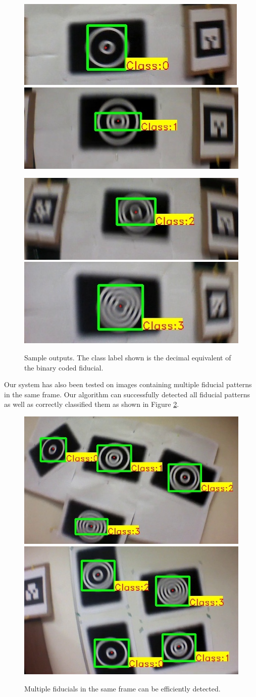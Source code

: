 \documentclass[10pt,twocolumn,letterpaper]{article}
\begin{document}
\begin{figure}[h!]
\centering
  \includegraphics[width=0.4\linewidth]{images/output_00.jpg}
  \includegraphics[width=0.4\linewidth]{images/output_01.jpg}

  \includegraphics[width=0.4\linewidth]{images/output_10.jpg}
  \includegraphics[width=0.4\linewidth]{images/output_11.jpg}
  \caption{Sample outputs. The class label shown is the decimal equivalent
  of the binary coded fiducial.}
  \label{fig:out_outputs}
\end{figure}

Our system has also been tested on images containing multiple fiducial
patterns in the same frame. Our algorithm can successfully detected
all fiducial patterns as well as correctly classified them as shown in
Figure \ref{fig:output_all}.

\begin{figure}[ht!]
\centering
  \includegraphics[width=.45\linewidth]{images/output_all_2.jpg}
  \includegraphics[width=.45\linewidth]{images/new_results/output_test_all1.jpg}
  \caption{Multiple fiducials in the same frame can be efficiently
    detected. }
  \label{fig:output_all}
\end{figure}
\end{document}
